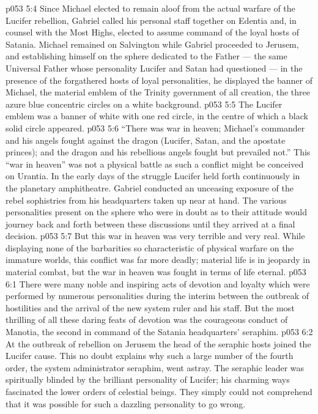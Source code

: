 \vs p053 5:4 \pc Since Michael elected to remain aloof from the actual warfare of the Lucifer rebellion, Gabriel called his personal staff together on Edentia and, in counsel with the Most Highs, elected to assume command of the loyal hosts of Satania. Michael remained on Salvington while Gabriel proceeded to Jerusem, and establishing himself on the sphere dedicated to the Father --- the same Universal Father whose personality Lucifer and Satan had questioned --- in the presence of the forgathered hosts of loyal personalities, he displayed the banner of Michael, the material emblem of the Trinity government of all creation, the three azure blue concentric circles on a white background.
\vs p053 5:5 The Lucifer emblem was a banner of white with one red circle, in the centre of which a black solid circle appeared.
\vs p053 5:6 “There was war in heaven; Michael’s commander and his angels fought against the dragon (Lucifer, Satan, and the apostate princes); and the dragon and his rebellious angels fought but prevailed not.” This “war in heaven” was not a physical battle as such a conflict might be conceived on Urantia. In the early days of the struggle Lucifer held forth continuously in the planetary amphitheatre. Gabriel conducted an unceasing exposure of the rebel sophistries from his headquarters taken up near at hand. The various personalities present on the sphere who were in doubt as to their attitude would journey back and forth between these discussions until they arrived at a final decision.
\vs p053 5:7 But this war in heaven was very terrible and very real. While displaying none of the barbarities so characteristic of physical warfare on the immature worlds, this conflict was far more deadly; material life is in jeopardy in material combat, but the war in heaven was fought in terms of life eternal.
\vs p053 6:1 There were many noble and inspiring acts of devotion and loyalty which were performed by numerous personalities during the interim between the outbreak of hostilities and the arrival of the new system ruler and his staff. But the most thrilling of all these daring feats of devotion was the courageous conduct of Manotia, the second in command of the Satania headquarters’ seraphim.
\vs p053 6:2 At the outbreak of rebellion on Jerusem the head of the seraphic hosts joined the Lucifer cause. This no doubt explains why such a large number of the fourth order, the system administrator seraphim, went astray. The seraphic leader was spiritually blinded by the brilliant personality of Lucifer; his charming ways fascinated the lower orders of celestial beings. They simply could not comprehend that it was possible for such a dazzling personality to go wrong.
